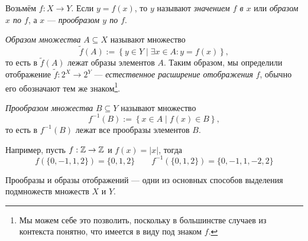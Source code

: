 Возьмём ${f:X\to Y}$. Если ${y=f(x)}$, то $y$ называют {\it значением $f$ в $x$}
 или {\it образом $x$ по $f$},
а $x$ --- {\it прообразом $y$ по $f$}.

{\it Образом множества} $A\subseteq X$
называют множество
\[
  \widetilde f(A):=\left\{y\in Y\;\big|\; \exists x\in A:y=f(x)\right\},
\]
то есть в $\widetilde f(A)$ лежат образы элементов $A$. Таким образом, мы определили
отображение $\widetilde f:2^{X}\to 2^{Y}$ ---
{\it естественное расширение отображения}
$f$, обычно его обозначают
тем же знаком\footnote{Мы можем себе это позволить, поскольку
  в большинстве случаев из контекста понятно, что имеется
  в виду под знаком $f$.}.

{\it Прообразом множества}
$B\subseteq Y$ называют множество
\[
  f^{-1}(B):=\left\{x\in A\;\big|\; f(x)\in B\right\},
\]
то есть в $f^{-1}(B)$ лежат все прообразы элементов $B$.

Например, пусть $f:\mathbb Z\to\mathbb Z$ и $f(x)=|x|$, тогда
\[
  f(\{0,-1,1,2\})=\{0,1,2\}\qquad f^{-1}(\{0,1,2\})=\{0,-1,1,-2,2\}
\]

Прообразы и образы отображений --- одни из основных способов выделения
подмножеств множеств $X$ и $Y$.

\vspace{1em}


